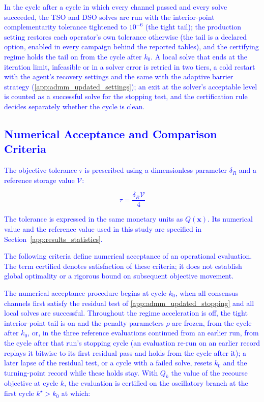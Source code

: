 \documentclass[preprint,12pt]{elsarticle}
\begin{document}
\textcolor{blue}{
    In the cycle after a cycle in which every channel passed and every solve succeeded, the TSO and DSO solves are run with the interior-point complementarity tolerance tightened to $10^{-6}$ (the tight tail); the production setting restores each operator's own tolerance otherwise (the tail is a declared option, enabled in every campaign behind the reported tables), and the certifying regime holds the tail on from the cycle after $k_0$. A local solve that ends at the iteration limit, infeasible or in a solver error is retried in two tiers, a cold restart with the agent's recovery settings and the same with the adaptive barrier strategy (\ref{app:admm_updated_settings}); an exit at the solver's acceptable level is counted as a successful solve for the stopping test, and the certification rule decides separately whether the cycle is clean.
}

\subsection{\textcolor{blue}{Numerical Acceptance and Comparison Criteria}}
\label{app:admm_updated_certification}

\textcolor{blue}{
    The objective tolerance $\tau$ is prescribed using a dimensionless parameter $\delta_R$ and a reference storage value $\mathcal{V}$:
}

\textcolor{blue}{
    \begin{equation}
        \tau = \frac{\delta_R\mathcal{V}}{4}
        \label{eq:acceptance_tolerance}
    \end{equation}
}

\textcolor{blue}{
    The tolerance is expressed in the same monetary units as $Q(\boldsymbol{x})$. Its numerical value and the reference value used in this study are specified in Section~\ref{app:results_statistics}.
}

\textcolor{blue}{
    The following criteria define numerical acceptance of an operational evaluation. The term certified denotes satisfaction of these criteria; it does not establish global optimality or a rigorous bound on subsequent objective movement.
}

\textcolor{blue}{
    The numerical acceptance procedure begins at cycle $k_0$, when all consensus channels first satisfy the residual test of \ref{app:admm_updated_stopping} and all local solves are successful.
    Throughout the regime acceleration is off, the tight interior-point tail is on and the penalty parameters $\rho$ are frozen, from the cycle after $k_0$, or, in the three reference evaluations continued from an earlier run, from the cycle after that run's stopping cycle (an evaluation re-run on an earlier record replays it bitwise to its first residual pass and holds from the cycle after it);
    a later lapse of the residual test, or a cycle with a failed solve, resets $k_0$ and the turning-point record while these holds stay. With $Q_k$ the value of the recourse objective at cycle $k$, the evaluation is certified on the oscillatory branch at the first cycle $k^{\star} > k_0$ at which:
}
\end{document}
